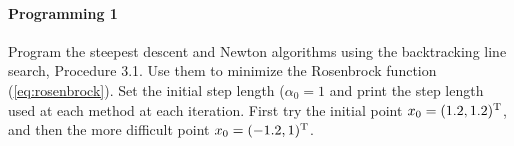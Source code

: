 \paragraph{Programming 1}  %
Program the steepest descent and Newton algorithms using the backtracking line
search, Procedure 3.1. Use them to minimize the Rosenbrock function
(\ref{eq:rosenbrock}). Set the initial step length ($\alpha_0=1$ and print the
step length used at each method at each iteration. First try the initial point
$x_0=(1.2, 1.2)^{\text{\upshape T}}$, and then the more difficult point $x_0=(-1.2, 1)^{\text{\upshape T}}$.



